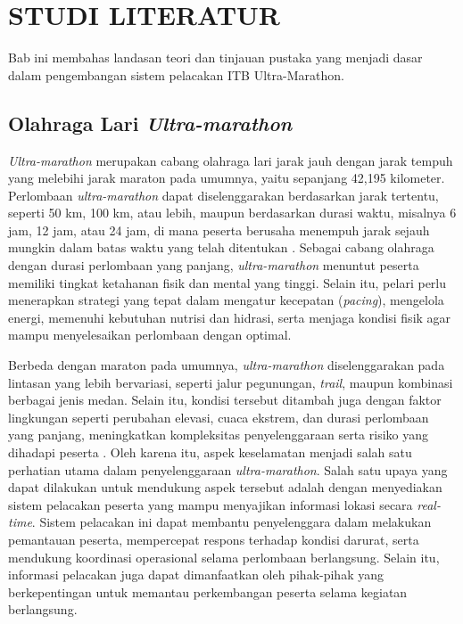 \cleardoublepage %
\chapter{STUDI LITERATUR}
\label{chap:studi-literatur}
Bab ini membahas landasan teori dan tinjauan pustaka yang menjadi dasar dalam pengembangan sistem pelacakan ITB Ultra-Marathon.
\section{Olahraga Lari \textit{Ultra-marathon}}

\textit{Ultra-marathon} merupakan cabang olahraga lari jarak jauh dengan jarak tempuh yang melebihi jarak maraton pada umumnya, yaitu sepanjang 42,195 kilometer. Perlombaan \textit{ultra-marathon} dapat diselenggarakan berdasarkan jarak tertentu, seperti 50 km, 100 km, atau lebih, maupun berdasarkan durasi waktu, misalnya 6 jam, 12 jam, atau 24 jam, di mana peserta berusaha menempuh jarak sejauh mungkin dalam batas waktu yang telah ditentukan \cite{scheer2020defining}. Sebagai cabang olahraga dengan durasi perlombaan yang panjang, \textit{ultra-marathon} menuntut peserta memiliki tingkat ketahanan fisik dan mental yang tinggi. Selain itu, pelari perlu menerapkan strategi yang tepat dalam mengatur kecepatan (\textit{pacing}), mengelola energi, memenuhi kebutuhan nutrisi dan hidrasi, serta menjaga kondisi fisik agar mampu menyelesaikan perlombaan dengan optimal.

Berbeda dengan maraton pada umumnya, \textit{ultra-marathon} diselenggarakan pada lintasan yang lebih bervariasi, seperti jalur pegunungan, \textit{trail}, maupun kombinasi berbagai jenis medan. Selain itu, kondisi tersebut ditambah juga dengan faktor lingkungan seperti perubahan elevasi, cuaca ekstrem, dan durasi perlombaan yang panjang, meningkatkan kompleksitas penyelenggaraan serta risiko yang dihadapi peserta \cite{hoffman2011factors}. Oleh karena itu, aspek keselamatan menjadi salah satu perhatian utama dalam penyelenggaraan \textit{ultra-marathon}. Salah satu upaya yang dapat dilakukan untuk mendukung aspek tersebut adalah dengan menyediakan sistem pelacakan peserta yang mampu menyajikan informasi lokasi secara \textit{real-time}. Sistem pelacakan ini dapat membantu penyelenggara dalam melakukan pemantauan peserta, mempercepat respons terhadap kondisi darurat, serta mendukung koordinasi operasional selama perlombaan berlangsung. Selain itu, informasi pelacakan juga dapat dimanfaatkan oleh pihak-pihak yang berkepentingan untuk memantau perkembangan peserta selama kegiatan berlangsung.

